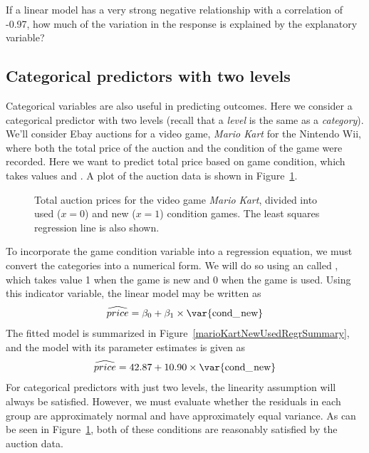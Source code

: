 \begin{exercisewrap}
\begin{nexercise}
If a linear model has a very strong negative relationship with a correlation of -0.97, how much of the variation in the response is explained by the explanatory variable?\footnotemark
\end{nexercise}
\end{exercisewrap}



\subsection{Categorical predictors with two levels}
\label{categoricalPredictorsWithTwoLevels}

Categorical variables are also useful in predicting outcomes.
Here we consider a categorical predictor with two levels
(recall that a \emph{level} is the same as a \emph{category}).
We'll consider Ebay auctions for a video game, \emph{Mario Kart}
for the Nintendo Wii, where both the total price of the auction
and the condition of the game were recorded.
Here we want to predict total price based on game condition,
which takes values  and .
A plot of the auction data is shown in Figure~\ref{marioKartNewUsed}.

\begin{figure}[h]
  \centering
  \caption{Total auction prices for the video game
      \emph{Mario Kart}, divided into used ($x=0$)
      and new ($x=1$) condition games.
      The least squares regression line is also shown.}
  \label{marioKartNewUsed}
\end{figure}

To incorporate the game condition variable into a regression equation, we must convert the categories into a numerical form. We will do so using an  called , which takes value 1 when the game is new and 0 when the game is used. Using this indicator variable, the linear model may be written as
\begin{align*}
\widehat{price} = \beta_0 + \beta_1 \times \text{\var{cond\_\hspace{0.3mm}new}}
\end{align*}
The fitted model is summarized in Figure~\ref{marioKartNewUsedRegrSummary}, and the model with its parameter estimates is given as
\begin{align*}
\widehat{price} = 42.87 + 10.90 \times \text{\var{cond\_\hspace{0.3mm}new}}
\end{align*}
For categorical predictors with just two levels, the linearity assumption will always be satisfied. However, we must evaluate whether the residuals in each group are approximately normal and have approximately equal variance. As can be seen in Figure~\ref{marioKartNewUsed}, both of these conditions are reasonably satisfied by the auction data.

